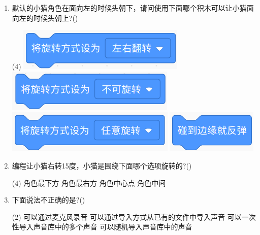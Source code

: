 \documentclass[10pt, a4paper]{article}
\begin{document}
\begin{enumerate}
        \item 默认的小猫角色在面向左的时候头朝下，请问使用下面哪个积木可以让小猫面向左的时候头朝上?(\qquad)
        \begin{tasks}(4)
            \task \includegraphics[width=.18\textwidth]{16a.png}
            \task \includegraphics[width=.18\textwidth]{16b.png}
            \task \includegraphics[width=.18\textwidth]{16c.png}
            \task \includegraphics[width=.1\textwidth]{16d.png}
        \end{tasks}

        \item 编程让小猫右转15度，小猫是围绕下面哪个选项旋转的?(\qquad)
        \begin{tasks}(4)
            \task 角色最下方
            \task 角色最右方
            \task 角色中心点
            \task 角色中间
        \end{tasks}

        \item 下面说法不正确的是?(\qquad)
        \begin{tasks}(2)
            \task 可以通过麦克风录音
            \task 可以通过导入方式从已有的文件中导入声音
            \task 可以一次性导入声音库中的多个声音
            \task 可以随机导入声音库中的声音
        \end{tasks}


\end{enumerate}
\end{document}
